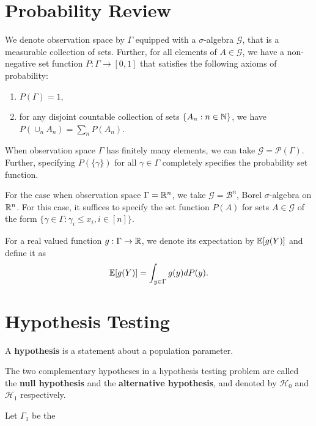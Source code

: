 \documentclass[a4paper,english,12pt]{article}
\begin{document}
\section{Probability Review}
We denote observation space by $\Gamma$ equipped with a $\sigma$-algebra $\mathcal{G}$, that is a  measurable collection of sets.
Further, for all elements of $A \in \mathcal{G}$, we have a non-negative set function $P: \Gamma \to [0,1]$ that satisfies the following axioms of probability:
\begin{enumerate}
\item $P(\Gamma) = 1$,
\item for any disjoint countable collection of sets $\{A_n: n \in \mathbb{N}\}$, we have $P(\cup_nA_n) = \sum_n P(A_n)$.
\end{enumerate}
\begin{exmp} When observation space $\Gamma$ has finitely many elements, we can take $\mathcal{G} = \mathcal{P}(\Gamma)$. 
Further, specifying $P(\{\gamma\})$ for all $\gamma \in \Gamma$ completely specifies the probability set function.
\end{exmp}
\begin{exmp} For the case when observation space $\Gamma = \mathbb{R}^n$, we take $\mathcal{G} = \mathcal{B}^n$, Borel $\sigma$-algebra on $\mathbb{R}^n$. 
For this case, it suffices to specify the set function $P(A)$ for  sets $A \in \mathcal{G}$ of the form $\{\gamma \in \Gamma: \gamma_i \leq x_i, i \in [n]\}$.
\end{exmp}
\begin{defn}[Expectation] For a real valued function $g: \Gamma \to \mathbb{R}$, we denote its expectation by $\mathbb{E}[g(Y)]$ and define it as
\begin{align*}
\mathbb{E}[g(Y)] = \int_{y \in \Gamma}g(y)dP(y).
\end{align*}
\end{defn}

\section{Hypothesis Testing}
\begin{defn} A \textbf{hypothesis} is a statement about a population parameter.
\end{defn}
\begin{defn} The two complementary hypotheses in a hypothesis testing problem are called the \textbf{null hypothesis} and the \textbf{alternative hypothesis}, and denoted by $\mathcal{H}_0$ and $\mathcal{H}_1$ respectively.
\end{defn}
Let $\Gamma_1$ be the
\begin{exmp}
\end{exmp}
\end{document}
